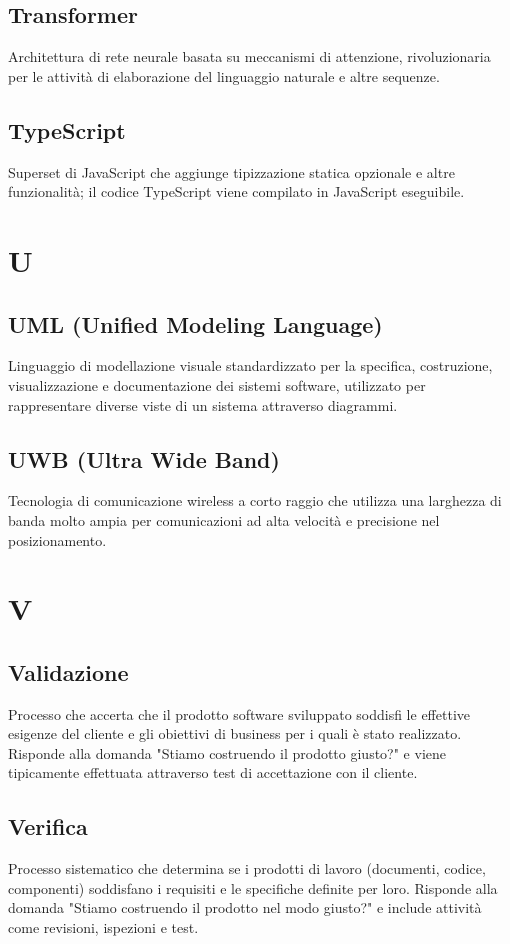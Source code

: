 \documentclass[a4paper,11pt]{article}
\begin{document}
\subsection{Transformer}
Architettura di rete neurale basata su meccanismi di attenzione, rivoluzionaria per le attività di elaborazione del linguaggio naturale e altre sequenze.

\subsection{TypeScript}
Superset di JavaScript che aggiunge tipizzazione statica opzionale e altre funzionalità; il codice TypeScript viene compilato in JavaScript eseguibile.

\newpage
\section{U}

\subsection{UML (Unified Modeling Language)}
Linguaggio di modellazione visuale standardizzato per la specifica, costruzione, visualizzazione e documentazione dei sistemi software, utilizzato per rappresentare diverse viste di un sistema attraverso diagrammi.

\subsection{UWB (Ultra Wide Band)}
Tecnologia di comunicazione wireless a corto raggio che utilizza una larghezza di banda molto ampia per comunicazioni ad alta velocità e precisione nel posizionamento.

\newpage
\section{V}

\subsection{Validazione}
Processo che accerta che il prodotto software sviluppato soddisfi le effettive esigenze del cliente e gli obiettivi di business per i quali è stato realizzato. Risponde alla domanda "Stiamo costruendo il prodotto giusto?" e viene tipicamente effettuata attraverso test di accettazione con il cliente.

\subsection{Verifica}
Processo sistematico che determina se i prodotti di lavoro (documenti, codice, componenti) soddisfano i requisiti e le specifiche definite per loro. Risponde alla domanda "Stiamo costruendo il prodotto nel modo giusto?" e include attività come revisioni, ispezioni e test.
\end{document}
